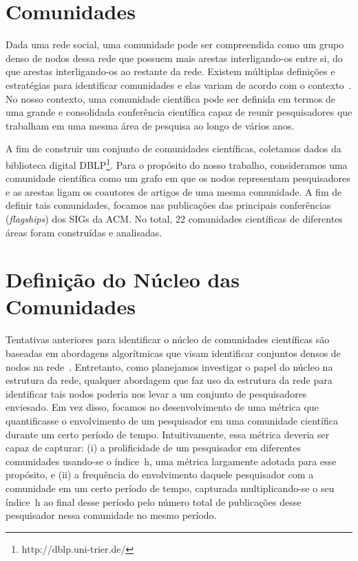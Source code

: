 \documentclass[12pt]{article}
\begin{document}
\section{Comunidades}

Dada uma rede social, uma comunidade pode ser compreendida como um grupo denso de nodos dessa rede que possuem mais arestas 
interligando-os entre si, do que arestas interligando-os ao restante da rede. Existem múltiplas definições e estratégias 
para identificar comunidades e elas variam de acordo com o contexto~\cite{Kleinberg2008,Leskovec2010}. No nosso contexto, 
uma comunidade científica pode ser definida em termos de uma grande e consolidada conferência científica capaz de reunir 
pesquisadores que trabalham em uma mesma área de pesquisa ao longo de vários anos.

A fim de construir um conjunto de comunidades científicas, coletamos dados da biblioteca digital DBLP\footnote{http://dblp.uni-trier.de/}.
Para o propósito do nosso 
trabalho, consideramos uma comunidade científica como um grafo em que os nodos 
representam pesquisadores e as arestas ligam os coautores de artigos de uma mesma comunidade. A fim de definir tais 
comunidades, focamos nas publicações das principais conferências (\textit{flagships}) dos SIGs 
da ACM. No total, 22 comunidades científicas de diferentes áreas foram construídas e analisadas.

\section{Definição do Núcleo das Comunidades}

Tentativas anteriores para identificar o núcleo de comunidades científicas são baseadas em abordagens 
algorítmicas que visam identificar conjuntos densos de nodos na rede~\cite{Seifi2012}. Entretanto, 
como planejamos investigar o papel do núcleo na estrutura da rede, qualquer abordagem que faz uso da 
estrutura da rede para identificar tais nodos poderia nos levar a um conjunto de pesquisadores 
enviesado. Em vez disso, focamos no desenvolvimento de uma métrica que quantificasse o envolvimento 
de um pesquisador em uma comunidade científica durante um certo período de tempo. Intuitivamente, 
essa métrica deveria ser capaz de capturar:  (i) a prolificidade de um pesquisador em diferentes 
comunidades usando-se o índice~h, uma métrica largamente adotada para esse propósito, e 
(ii) a frequência do envolvimento daquele pesquisador com a comunidade em um certo 
período de tempo, capturada multiplicando-se o seu índice~h 
ao final desse período pelo número total de publicações desse pesquisador nessa comunidade 
no mesmo período.
\end{document}
